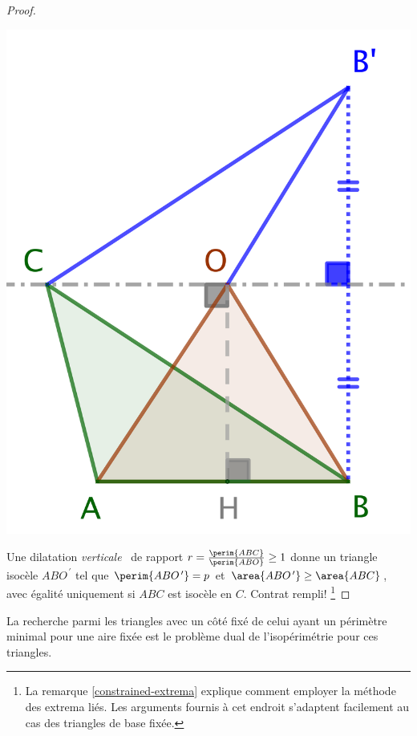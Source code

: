 \begin{proof}
	\begin{center}
		\includegraphics[scale=.4]{content/triangle-one-side-fixed/proof.png}
	\end{center}
	
	Une dilatation \og \emph{verticale} \fg\ de rapport $r = \frac{\perim{ABC}}{\perim{ABO}} \geq 1$ donne un triangle isocèle $ABO^{\,\prime}$ tel que 
	$\perim{ABO^{\,\prime}} = p$
	et 
	$\area{ABO^{\,\prime}} \geq \area{ABC}$, avec égalité uniquement si $ABC$ est isocèle en $C$. 
	Contrat rempli!%
	\footnote{
		La remarque \ref{constrained-extrema} explique comment employer la méthode des extrema liés. 
		Les arguments fournis à cet endroit s'adaptent facilement au cas des triangles de base fixée.
	}
\end{proof}




\begin{remark}
	La recherche parmi les triangles avec un côté fixé de celui ayant un périmètre minimal pour une aire fixée est le problème dual de l'isopérimétrie pour ces triangles.
\end{remark}
